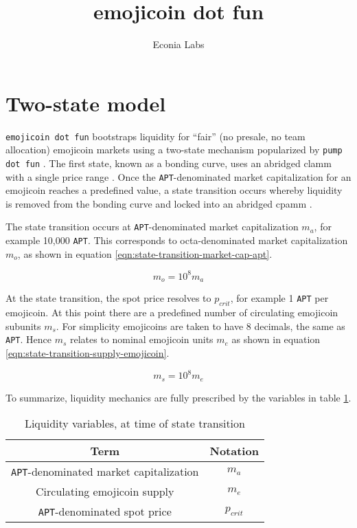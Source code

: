 \documentclass[table, twocolumn]{article}
\title{emojicoin dot fun}
\author{Econia Labs}
\date{}
\begin{document}
\maketitle

\section{Two-state model}

\texttt{emojicoin dot fun} bootstraps liquidity for ``fair'' (no presale, no team
allocation) emojicoin \cite{emojicoin} markets using a two-state mechanism popularized
by \texttt{pump dot fun} \cite{pump}. The first state, known as a bonding curve, uses an
abridged \gls*{clamm} with a single price range \cite{univ3}. Once the
\texttt{APT}-denominated market capitalization for an emojicoin reaches a predefined
value, a state transition occurs whereby liquidity is removed from the bonding curve and
locked into an abridged \gls*{cpamm} \cite{univ2}.

The state transition occurs at \texttt{APT}-denominated market capitalization $m_a$, for
example 10,000 \texttt{APT}. This corresponds to octa-denominated \cite{octa} market
capitalization $m_o$, as shown in equation \ref{eqn:state-transition-market-cap-apt}.

\begin{equation} \label{eqn:state-transition-market-cap-apt}
  m_o = 10^8 m_a
\end{equation}

At the state transition, the spot price resolves to $p_{crit}$, for example 1
\texttt{APT} per emojicoin. At this point there are a predefined number of circulating
emojicoin subunits $m_s$. For simplicity emojicoins are taken to have 8 decimals, the
same as \texttt{APT}. Hence $m_s$ relates to nominal emojicoin units $m_e$ as shown
in equation \ref{eqn:state-transition-supply-emojicoin}.

\begin{equation} \label{eqn:state-transition-supply-emojicoin}
  m_s = 10^8 m_e
\end{equation}

To summarize, liquidity mechanics are fully prescribed by the variables in table
\ref{tab:state-model-variables}.

\begin{table}[!htb]
  \centering
  \begin{tabular}{|c|c|}
    \hline \rowcolor{blue}
    Term                                           & Notation   \\ \hline
    \texttt{APT}-denominated market capitalization & $m_a$      \\ \hline
    Circulating emojicoin supply                   & $m_e$      \\ \hline
    \texttt{APT}-denominated spot price            & $p_{crit}$ \\ \hline
  \end{tabular}
  \caption{Liquidity variables, at time of state transition}
  \label{tab:state-model-variables}
\end{table}
\end{document}
